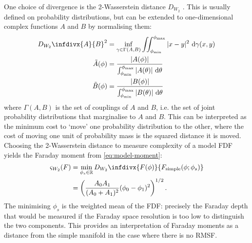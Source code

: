         One choice of divergence is the 2-Wasserstein distance $D_{W_2}$ \citeneeded{}. This is usually defined on probability distributions, but can be extended to one-dimensional complex functions $A$ and $B$ by normalising them:
        \begin{align}
          \label{eq:w2}
          D_{W_2}\infdivx{A}{B}^2 &= \inf_{\gamma \in \Gamma(A, B)} \iint_{\phi_{\min}}^{\phi_{\max}} |x - y|^2\ \mathrm{d}\gamma(x, y) \\
          \label{eq:normalised}
          \tilde A(\phi) &= \frac{|A(\phi)|}{\int_{\phi_{\min}}^{\phi_{\max}} |A(\theta)|\ \mathrm{d}\theta}\\
          \tilde B(\phi) &= \frac{|B(\phi)|}{\int_{\phi_{\min}}^{\phi_{\max}} |B(\theta)|\ \mathrm{d}\theta}
        \end{align}
        where $\Gamma(A, B)$ is the set of couplings of $A$ and $B$, i.e. the set of joint probability distributions that marginalise to $A$ and $B$. This can be interpreted as the minimum cost to `move' one probability distribution to the other, where the cost of moving one unit of probability mass is the squared distance it is moved. Choosing the 2-Wasserstein distance to measure complexity of a model FDF yields the Faraday moment from \autoref{eq:model-moment}:
        \begin{align}
            \varsigma_{W_2}(F) &= \min_{\phi_s \in \mathbb{R}} D_{W_2}\infdivx{F(\phi)}{F_{\mathrm{simple}}(\phi; \phi_s)}\\
                &= \left(\frac{A_0A_1}{(A_0 + A_1)^2} (\phi_0 - \phi_1)^2\right)^{1/2}.
        \end{align}
        The minimising $\phi_s$ is the weighted mean of the FDF: precisely the Faraday depth that would be measured if the Faraday space resolution is too low to distinguish the two components. This provides an interpretation of Faraday moments as a distance from the simple manifold in the case where there is no RMSF.

